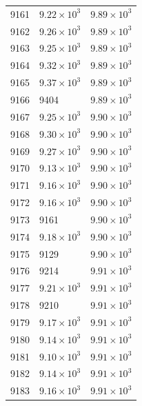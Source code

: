 \begin{table}[H]
\begin{tabular}{lll}
9161 & $\displaystyle 9.22 \times 10^{3}$ & $\displaystyle 9.89 \times 10^{3}$ \\
9162 & $\displaystyle 9.26 \times 10^{3}$ & $\displaystyle 9.89 \times 10^{3}$ \\
9163 & $\displaystyle 9.25 \times 10^{3}$ & $\displaystyle 9.89 \times 10^{3}$ \\
9164 & $\displaystyle 9.32 \times 10^{3}$ & $\displaystyle 9.89 \times 10^{3}$ \\
9165 & $\displaystyle 9.37 \times 10^{3}$ & $\displaystyle 9.89 \times 10^{3}$ \\
9166 & 9404 & $\displaystyle 9.89 \times 10^{3}$ \\
9167 & $\displaystyle 9.25 \times 10^{3}$ & $\displaystyle 9.90 \times 10^{3}$ \\
9168 & $\displaystyle 9.30 \times 10^{3}$ & $\displaystyle 9.90 \times 10^{3}$ \\
9169 & $\displaystyle 9.27 \times 10^{3}$ & $\displaystyle 9.90 \times 10^{3}$ \\
9170 & $\displaystyle 9.13 \times 10^{3}$ & $\displaystyle 9.90 \times 10^{3}$ \\
9171 & $\displaystyle 9.16 \times 10^{3}$ & $\displaystyle 9.90 \times 10^{3}$ \\
9172 & $\displaystyle 9.16 \times 10^{3}$ & $\displaystyle 9.90 \times 10^{3}$ \\
9173 & 9161 & $\displaystyle 9.90 \times 10^{3}$ \\
9174 & $\displaystyle 9.18 \times 10^{3}$ & $\displaystyle 9.90 \times 10^{3}$ \\
9175 & 9129 & $\displaystyle 9.90 \times 10^{3}$ \\
9176 & 9214 & $\displaystyle 9.91 \times 10^{3}$ \\
9177 & $\displaystyle 9.21 \times 10^{3}$ & $\displaystyle 9.91 \times 10^{3}$ \\
9178 & 9210 & $\displaystyle 9.91 \times 10^{3}$ \\
9179 & $\displaystyle 9.17 \times 10^{3}$ & $\displaystyle 9.91 \times 10^{3}$ \\
9180 & $\displaystyle 9.14 \times 10^{3}$ & $\displaystyle 9.91 \times 10^{3}$ \\
9181 & $\displaystyle 9.10 \times 10^{3}$ & $\displaystyle 9.91 \times 10^{3}$ \\
9182 & $\displaystyle 9.14 \times 10^{3}$ & $\displaystyle 9.91 \times 10^{3}$ \\
9183 & $\displaystyle 9.16 \times 10^{3}$ & $\displaystyle 9.91 \times 10^{3}$ \\

\end{tabular}
\end{table}
